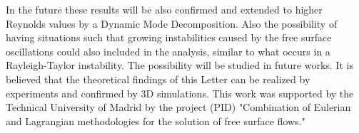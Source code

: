 \documentclass[%
 reprint,
 amsmath,amssymb,
 aps,
prl
]{revtex4-1}
\begin{document}


In the future these results will be also confirmed and extended to higher Reynolds values by a Dynamic Mode Decomposition. Also the possibility of having situations such that growing instabilities caused by the free surface oscillations could also included in the analysis, similar to what occurs in a Rayleigh-Taylor instability. The possibility will be studied in future works. 
It is believed that the theoretical findings of this Letter can be realized by experiments and confirmed by 3D simulations. This work was supported by the Technical University of Madrid by the project (PID) "Combination of Eulerian and Lagrangian methodologies for the solution of free surface flows."



\end{document}
